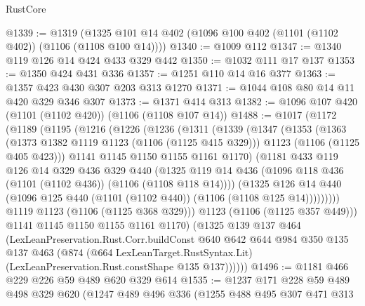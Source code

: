 \begin{lexlean}{RustCore}
\begin{coremodule}
@1339 := @1319 (@1325 @101 @14 @402 (@1096 @100 @402 (@1101 (@1102 @402)) (@1106 (@1108 @100 @14))))
@1340 := @1009 @112
@1347 := @1340 @119 @126 @14 @424 @433 @329 @442
@1350 := @1032 @111 @17 @137
@1353 := @1350 @424 @431 @336
@1357 := @1251 @110 @14 @16 @377
@1363 := @1357 @423 @430 @307 @203 @313 @1270
@1371 := @1044 @108 @80 @14 @11 @420 @329 @346 @307
@1373 := @1371 @414 @313
@1382 := @1096 @107 @420 (@1101 (@1102 @420)) (@1106 (@1108 @107 @14))
@1488 := @1017
    (@1172
      (@1189
        (@1195
          (@1216
            (@1226
              (@1236
                (@1311
                  (@1339
                    (@1347
                      (@1353
                        (@1363
                          (@1373 @1382 @1119 @1123 (@1106 (@1125 @415 @329)))
                          @1123
                          (@1106 (@1125 @405 @423)))
                        @1141
                        @1145
                        @1150
                        @1155
                        @1161
                        @1170)
                      (@1181
                        @433
                        @119
                        @126
                        @14
                        @329
                        @436
                        @329
                        @440
                        (@1325
                          @119
                          @14
                          @436
                          (@1096 @118 @436 (@1101 (@1102 @436)) (@1106 (@1108 @118 @14))))
                        (@1325
                          @126
                          @14
                          @440
                          (@1096 @125 @440 (@1101 (@1102 @440)) (@1106 (@1108 @125 @14)))))))))
              @1119
              @1123
              (@1106 (@1125 @368 @329)))
            @1123
            (@1106 (@1125 @357 @449)))
          @1141
          @1145
          @1150
          @1155
          @1161
          @1170)
        (@1325
          @139
          @137
          @464
          (LexLeanPreservation.Rust.Corr.buildConst
            @640
            @642
            @644
            @984
            @350
            @135
            @137
            @463
            (@874
              (@664 LexLeanTarget.RustSyntax.Lit)
              (LexLeanPreservation.Rust.constShape @135 @137))))))
@1496 := @1181 @466 @229 @226 @59 @489 @620 @329 @614
@1535 := @1237
    @171
    @228
    @59
    @489
    @498
    @329
    @620
    (@1247
      @489
      @496
      @336
      (@1255
        @488
        @495
        @307
        @471
        @313

\end{coremodule}
\end{lexlean}
